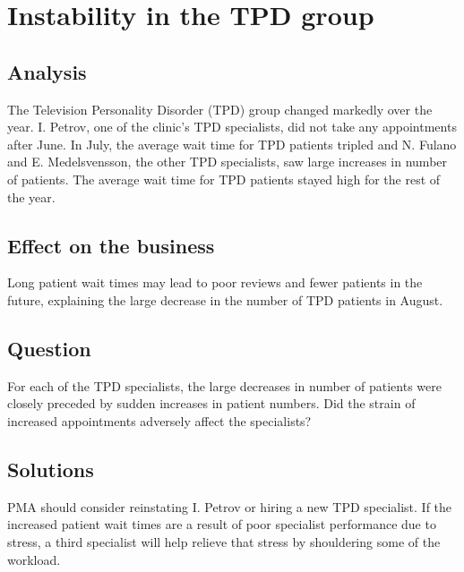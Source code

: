 \section{Instability in the TPD group}

\subsection{Analysis}
The Television Personality Disorder (TPD) group changed markedly over the year. I. Petrov, one of the clinic's TPD specialists, did not take any appointments after June. In July, the average wait time for TPD patients tripled and N. Fulano and E. Medelsvensson, the other TPD specialists, saw large increases in number of patients. The average wait time for TPD patients stayed high for the rest of the year.

\begin{figure}[h]
{}
\label{apmd}
\end{figure}

\subsection{Effect on the business}

Long patient wait times may lead to poor reviews and fewer patients in the future, explaining the large decrease in the number of TPD patients in August.

\begin{comment}
\begin{figure}[h]
\centering
\makebox[\textwidth][c]{\texttt{[image: plots/appts\_per\_month\_cond]}}
\label{apmc}
\end{figure}
\end{comment}

\subsection{Question}
For each of the TPD specialists, the large decreases in number of patients were closely preceded by sudden increases in patient numbers. Did the strain of increased appointments adversely affect the specialists?

\subsection{Solutions}
PMA should consider reinstating I. Petrov or hiring a new TPD specialist. If the increased patient wait times are a result of poor specialist performance due to stress, a third specialist will help relieve that stress by shouldering some of the workload.
